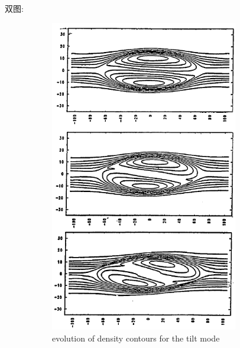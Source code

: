 \documentclass{article}
\begin{document}
双图:
\begin{figure}[!hbtp]
    \centering
    \begin{subfigure}[b]{0.45\textwidth}
    \centering
    \includegraphics[width=0.9\textwidth]{figs/tilt.png} 
    \caption{evolution of density contours for the tilt mode}
    \label{fig: tilt}
    \end{subfigure}
    \hfill %
    \begin{subfigure}[b]{0.45\textwidth}
    \centering

\end{subfigure}
\end{figure}
\end{document}
